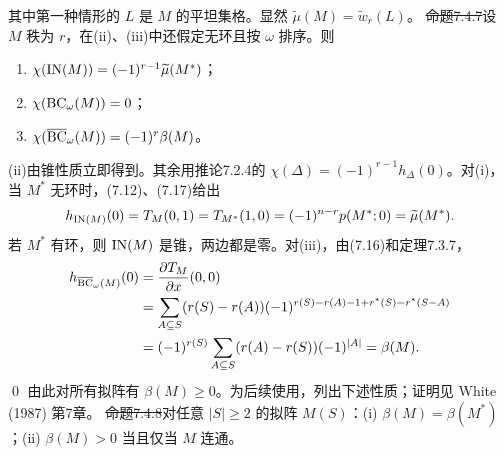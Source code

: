 其中第一种情形的 $L$ 是 $M$ 的平坦集格。显然 $\widetilde\mu(M)=\widetilde w_r(L)$。
\st{命题7.4.7}设 $M$ 秩为 $r$，在(ii)、(iii)中还假定无环且按 $\omega$ 排序。则
\begin{enumerate}[label=(\roman*)]
\item $\chi(\operatorname{IN}(M))=(-1)^{r-1}\widetilde\mu(M^*)$；
\item $\chi(\operatorname{BC}_\omega(M))=0$；
\item $\chi(\overline{\operatorname{BC}}_\omega(M))=(-1)^r\beta(M)$。
\end{enumerate}
\pr (ii)由锥性质立即得到。其余用推论7.2.4的 $\chi(\Delta)=(-1)^{r-1}h_\Delta(0)$。对(i)，当 $M^*$ 无环时，(7.12)、(7.17)给出
\[h_{\operatorname{IN}(M)}(0)=T_M(0,1)=T_{M^*}(1,0)=(-1)^{n-r}p(M^*;0)=\widetilde\mu(M^*).\]
若 $M^*$ 有环，则 $\operatorname{IN}(M)$ 是锥，两边都是零。对(iii)，由(7.16)和定理7.3.7，
\[\begin{aligned}
h_{\overline{\operatorname{BC}}_\omega(M)}(0)&=\frac{\partial T_M}{\partial x}(0,0)\\
&=\sum_{A\subseteq S}(r(S)-r(A))(-1)^{r(S)-r(A)-1+r^*(S)-r^*(S-A)}\\
&=(-1)^{r(S)}\sum_{A\subseteq S}(r(A)-r(S))(-1)^{|A|}=\beta(M).
\end{aligned}\]\qed
由此对所有拟阵有 $\beta(M)\ge0$。为后续使用，列出下述性质；证明见 White (1987) 第7章。
\st{命题7.4.8}对任意 $|S|\ge2$ 的拟阵 $M(S)$：(i) $\beta(M)=\beta(M^*)$；(ii) $\beta(M)>0$ 当且仅当 $M$ 连通。
